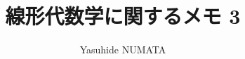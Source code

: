 \documentclass[tombow,dvipdfmx]{jsbook}
\theoremstyle{plain}
\theoremstyle{japanese}
\theoremstyle{remark}
\theoremstyle{japanese}
\theoremstyle{definition}
\theoremstyle{japanese}
\theoremstyle{definition}
\theoremstyle{numberedproof}
\theoremstyle{japanesenumberedproof}
\begin{document}
\title{線形代数学に関するメモ 3}

\author{Yasuhide NUMATA}

\maketitle




%

%


%
%
%

{\printindex}
\end{document}
